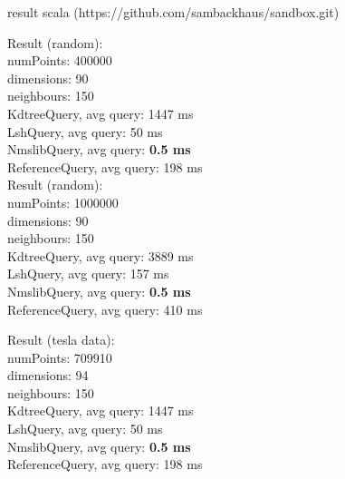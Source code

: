 \documentclass[xcolor=dvipsnames, aspectratio=1610]{beamer}
\newcommand{\alertA}[1]{\color{alertAcolor}#1\color{Black}}
\begin{document}
\begin{frame}[fragile]{result scala (https://github.com/sambackhaus/sandbox.git)} 
\linespread{1}\scriptsize{
\begin{minipage}{0.48\textwidth}  
\begin{flushleft}
Result (random):\\
numPoints: 400000\\
dimensions: 90\\
neighbours: 150\\

KdtreeQuery, avg query: 1447 ms\\
LshQuery, avg query: 50 ms\\
NmslibQuery, avg query: {\alertA{\bf{0.5 ms}}}\\
ReferenceQuery, avg query: 198 ms\\
\vspace{1cm}
Result (random):\\
numPoints: 1000000\\
dimensions: 90\\
neighbours: 150\\

KdtreeQuery, avg query: 3889 ms\\
LshQuery, avg query: 157 ms\\
NmslibQuery, avg query: {\alertA{\bf{ 0.5 ms}}} \\
ReferenceQuery, avg query: 410 ms
\end{flushleft}
\end{minipage}
\begin{minipage}{0.48\textwidth}  

\begin{flushleft}
Result (tesla data):\\
numPoints: 709910\\
dimensions: 94\\
neighbours: 150\\

KdtreeQuery, avg query: 1447 ms\\
LshQuery, avg query: 50 ms\\
NmslibQuery, avg query: {\alertA{\bf{0.5 ms}}}\\
ReferenceQuery, avg query: 198 ms\\
\end{flushleft}
\end{minipage}
}
\end{frame}
\end{document}

